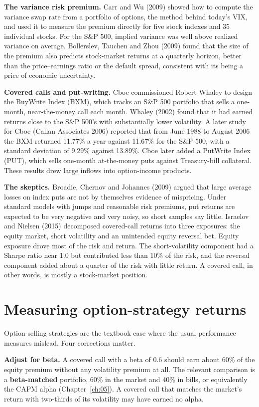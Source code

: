 \textbf{The variance risk premium.} Carr and Wu (2009) showed how to compute the variance swap rate from a portfolio of options, the method behind today's VIX, and used it to measure the premium directly for five stock indexes and 35 individual stocks. For the S\&P 500, implied variance was well above realized variance on average. Bollerslev, Tauchen and Zhou (2009) found that the size of the premium also predicts stock-market returns at a quarterly horizon, better than the price--earnings ratio or the default spread, consistent with its being a price of economic uncertainty.

\textbf{Covered calls and put-writing.} Cboe commissioned Robert Whaley to design the BuyWrite Index (BXM), which tracks an S\&P 500 portfolio that sells a one-month, near-the-money call each month. Whaley (2002) found that it had earned returns close to the S\&P 500's with substantially lower volatility. A later study for Cboe (Callan Associates 2006) reported that from June 1988 to August 2006 the BXM returned 11.77\% a year against 11.67\% for the S\&P 500, with a standard deviation of 9.29\% against 13.89\%. Cboe later added a PutWrite Index (PUT), which sells one-month at-the-money puts against Treasury-bill collateral. These results drew large inflows into option-income products.

\textbf{The skeptics.} Broadie, Chernov and Johannes (2009) argued that large average losses on index puts are not by themselves evidence of mispricing. Under standard models with jumps and reasonable risk premiums, put returns are expected to be very negative and very noisy, so short samples say little. Israelov and Nielsen (2015) decomposed covered-call returns into three exposures: the equity market, short volatility and an unintended equity reversal bet. Equity exposure drove most of the risk and return. The short-volatility component had a Sharpe ratio near 1.0 but contributed less than 10\% of the risk, and the reversal component added about a quarter of the risk with little return. A covered call, in other words, is mostly a stock-market position.

\section{Measuring option-strategy returns}
\label{sec:16-measure}

Option-selling strategies are the textbook case where the usual performance measures mislead. Four corrections matter.

\textbf{Adjust for beta.} A covered call with a beta of 0.6 should earn about 60\% of the equity premium without any volatility premium at all. The relevant comparison is a \textbf{beta-matched} portfolio, 60\% in the market and 40\% in bills, or equivalently the CAPM alpha (Chapter~\ref{ch:05}). A covered call that matches the market's return with two-thirds of its volatility may have earned no alpha.

